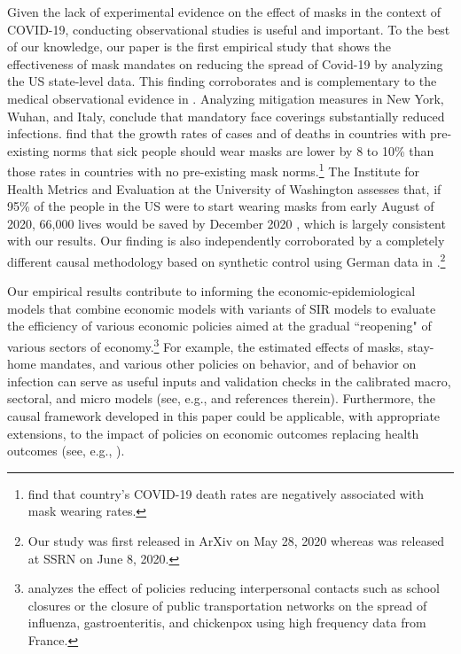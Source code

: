 \documentclass[3p, longtitle]{elsarticle}
\theoremstyle{definition}
\begin{document}
Given the lack of experimental evidence on the effect of masks in the context of COVID-19, conducting observational studies  is useful and important. To the best of our knowledge, our paper is the first  empirical study that shows the effectiveness of  mask mandates on reducing the spread of Covid-19 by analyzing the US state-level data. This finding corroborates and is complementary to the medical observational evidence in \cite{howard2020}. Analyzing mitigation measures in New York, Wuhan, and Italy, \cite{zhangr2020} conclude that mandatory face coverings substantially reduced infections. \cite{abaluck2020}  find that the growth rates of cases and of deaths in countries with pre-existing norms that sick people should wear masks are lower by 8 to 10\% than those rates in countries with no pre-existing mask norms.\footnote{\cite{miyazawa2020} find that  country's COVID-19 death rates are negatively associated with mask wearing rates.} The Institute for Health Metrics and Evaluation at the University of Washington  assesses that, if 95\% of the people in the US were to start wearing masks from early August of 2020, 66,000 lives would be saved by December 2020 \citep{IHME2020}, which is largely consistent with our results.
Our finding is also independently corroborated by a completely different causal methodology based on synthetic control
using German data in \cite{Mitze2020}.\footnote{Our study was first released in ArXiv on May 28, 2020 whereas
 \cite{Mitze2020} was released at SSRN on June 8, 2020. }

Our empirical results contribute to informing the economic-epidemiological models that combine economic models with variants of SIR models to evaluate the efficiency of various economic policies aimed at  the gradual ``reopening" of various sectors of economy.\footnote{\cite{adda2016} analyzes the effect of policies reducing interpersonal contacts such as school closures or the closure of public transportation networks on the spread of  influenza, gastroenteritis, and chickenpox using high frequency data from France.} For example, the estimated effects of masks, stay-home mandates, and various other policies on behavior, and of behavior on infection can serve as useful inputs and validation checks in the calibrated macro, sectoral, and micro models (see, e.g., \cite{alvarez2020simple,baqaee2020reopening,NBERw27128,acemoglu2020multi,lsmith,nashSIR} and references therein). Furthermore, the causal framework developed in this paper could be applicable, with appropriate extensions, to the impact of policies on economic outcomes replacing health outcomes (see, e.g., \cite{chetty2020real,coibion2020labor}).
\end{document}
